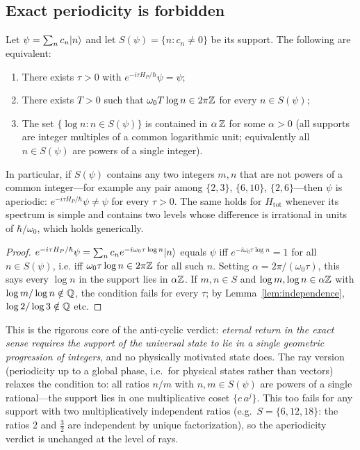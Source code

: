 \subsection{Exact periodicity is forbidden}

\begin{theorem}\label{thm:noperiod}
Let $\psi=\sum_{n}c_{n}\lvert n\rangle$ and let $S(\psi)=\{n:c_{n}\neq0\}$ be its support. The
following are equivalent:
\begin{enumerate}[leftmargin=1.6em]
\item There exists $\tau>0$ with $e^{-i\tau H_{P}/\hbar}\psi=\psi$;
\item There exists $T>0$ such that $\omega_{0}T\log n\in2\pi\mathbb{Z}$ for every $n\in S(\psi)$;
\item The set $\{\log n:n\in S(\psi)\}$ is contained in $\alpha\,\mathbb{Z}$ for some $\alpha>0$
(all supports are integer multiples of a common logarithmic unit; equivalently all $n\in
S(\psi)$ are powers of a single integer).
\end{enumerate}
In particular, if $S(\psi)$ contains any two integers $m,n$ that are not powers of a common
integer---for example any pair among $\{2,3\}$, $\{6,10\}$, $\{2,6\}$---then $\psi$ is
aperiodic: $e^{-i\tau H_{P}/\hbar}\psi\neq\psi$ for every $\tau>0$. The same holds for
$H_{\mathrm{tot}}$ whenever its spectrum is simple and contains two levels whose difference is
irrational in units of $\hbar/\omega_{0}$, which holds generically.
\end{theorem}

\begin{proof}
$e^{-i\tau H_{P}/\hbar}\psi=\sum_{n}c_{n}e^{-i\omega_{0}\tau\log n}\lvert n\rangle$ equals $\psi$ iff
$e^{-i\omega_{0}\tau\log n}=1$ for all $n\in S(\psi)$, i.e. iff
$\omega_{0}\tau\log n\in2\pi\mathbb{Z}$ for all such $n$. Setting $\alpha=2\pi/(\omega_{0}\tau)$,
this says every $\log n$ in the support lies in $\alpha\mathbb{Z}$. If $m,n\in S$ and
$\log m,\log n\in\alpha\mathbb{Z}$ with $\log m/\log n\notin\mathbb{Q}$, the condition fails for every
$\tau$; by Lemma~\ref{lem:independence}, $\log 2/\log 3\notin\mathbb{Q}$ etc.
\end{proof}

This is the rigorous core of the anti-cyclic verdict: \emph{eternal return in the exact sense
requires the support of the universal state to lie in a single geometric progression of
integers}, and no physically motivated state does. The ray version (periodicity up to a global
phase, i.e.\ for physical states rather than vectors) relaxes the condition to: all ratios
$n/m$ with $n,m\in S(\psi)$ are powers of a single rational---the support lies in one
multiplicative coset $\{c\,a^{j}\}$. This too fails for any support with two
multiplicatively independent ratios (e.g.\ $S=\{6,12,18\}$: the ratios $2$ and $\tfrac32$
are independent by unique factorization), so the aperiodicity verdict is unchanged at the
level of rays.

